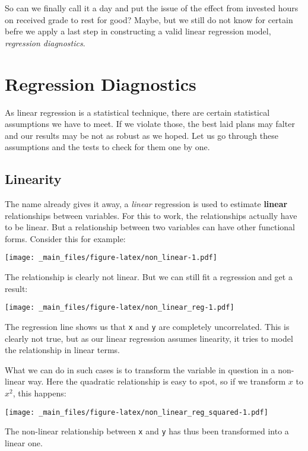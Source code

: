 \documentclass[
]{book}
\begin{document}
So can we finally call it a day and put the issue of the effect from invested
hours on received grade to rest for good? Maybe, but we still do not know for
certain befre we apply a last step in constructing a valid linear regression
model, \emph{regression diagnostics}.

\hypertarget{regression-diagnostics}{%
\section{Regression Diagnostics}\label{regression-diagnostics}}

As linear regression is a statistical technique, there are certain statistical
assumptions we have to meet. If we violate those, the best laid plans may
falter and our results may be not as robust as we hoped.
Let us go through these assumptions and the tests to check for them one by one.

\hypertarget{linearity}{%
\subsection{Linearity}\label{linearity}}

The name already gives it away, a \emph{linear} regression is used to estimate
\textbf{linear} relationships between variables. For this to work, the relationships
actually have to be linear. But a relationship between two variables can have
other functional forms. Consider this for example:

\texttt{[image: \_main\_files/figure-latex/non\_linear-1.pdf]}

The relationship is clearly not linear. But we can still fit a regression and
get a result:

\texttt{[image: \_main\_files/figure-latex/non\_linear\_reg-1.pdf]}

The regression line shows us that \texttt{x} and \texttt{y} are completely uncorrelated. This
is clearly not true, but as our linear regression assumes linearity, it tries to
model the relationship in linear terms.

What we can do in such cases is to transform the variable in question in a
non-linear way. Here the quadratic relationship is easy to spot, so if we
transform \(x\) to \(x^2\), this happens:

\texttt{[image: \_main\_files/figure-latex/non\_linear\_reg\_squared-1.pdf]}

The non-linear relationship between \texttt{x} and \texttt{y} has thus been transformed into a
linear one.
\end{document}
